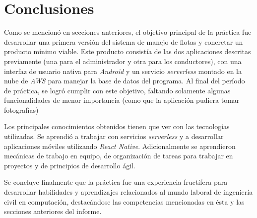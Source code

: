 \section{Conclusiones}
  Como se mencionó en secciones anteriores, el objetivo principal de la práctica fue 
  desarrollar una primera versión del sistema de manejo de flotas y concretar un producto
  mínimo viable.
  Este producto consistía de las dos aplicaciones descritas previamente (una para el 
  administrador y otra para los conductores), con una interfaz de usuario nativa para 
  \textit{Android} y un servicio \textit{serverless} montado en la nube de \textit{AWS}
  para manejar la base de datos del programa.
  Al final del período de práctica, se logró cumplir con este objetivo, faltando solamente
  algunas funcionalidades de menor importancia (como que la aplicación pudiera tomar 
  fotografías)

  Los principales conocimientos obtenidos tienen  que ver con las tecnologías utilizadas.
  Se aprendió a trabajar con servicios \textit{serverless} y a desarrollar aplicaciones 
  móviles utilizando \textit{React Native}.
  Adicionalmente se aprendieron mecánicas de trabajo en equipo, de organización de tareas
  para trabajar en proyectos y de principios de desarrollo ágil.

  Se concluye finalmente que la práctica fue una experiencia fructífera para desarrollar
  habilidades y aprendizajes relacionados al mundo laboral de ingeniería civil en 
  computación, destacándose las competencias mencionadas en ésta y las secciones 
  anteriores del informe. 
